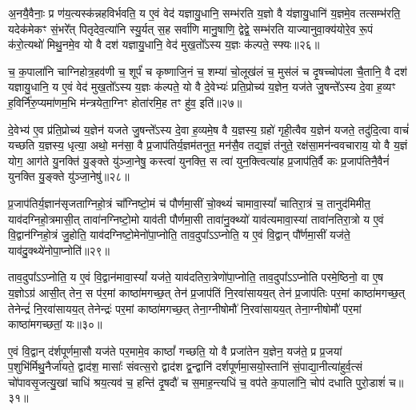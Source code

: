 अ॒नयै॒वैनाः॒ प्र ण॑य॒त्यस्क॑न्नहविर्भवति॒ य ए॒वं वेद॑ यज्ञायु॒धानि॒ सम्भ॑रति य॒ज्ञो वै य॑ज्ञायु॒धानि॑ य॒ज्ञमे॒व तत्सम्भ॑रति॒ यदेक॑मेकꣳ सं॒भरे᳚त् पितृदेव॒त्या॑नि स्यु॒र्यत् स॒ह सर्वा॑णि मानु॒षाणि॒ द्वेद्वे॒ सम्भ॑रति याज्यानुवा॒क्य॑योरे॒व रू॒पं क॑रो॒त्यथो॑ मिथु॒नमे॒व यो वै दश॑ यज्ञायु॒धानि॒ वेद॑ मुख॒तो᳚\-ऽस्य य॒ज्ञः क॑ल्पते॒ स्फ्यः॥२६॥

च॒ क॒पाला॑नि चाग्निहोत्र॒हव॑णी च॒ शूर्पं॑ च कृष्णाजि॒नं च॒ शम्या॑ चो॒लूख॑लं च॒ मुस॑लं च दृ॒षच्चोप॑ला चै॒तानि॒ वै दश॑ यज्ञायु॒धानि॒ य ए॒वं वेद॑ मुख॒तो᳚\-ऽस्य य॒ज्ञः क॑ल्पते॒ यो वै दे॒वेभ्यः॑ प्रति॒प्रोच्य॑ य॒ज्ञेन॒ यज॑ते जु॒षन्ते᳚\-ऽस्य दे॒वा ह॒व्यꣳ ह॒विर्नि॑रु॒प्यमा॑णम॒भि म॑न्त्रयेता॒ग्निꣳ होता॑रमि॒ह तꣳ हु॑व॒ इति॑॥२७॥

दे॒वेभ्य॑ ए॒व प्र॑ति॒प्रोच्य॑ य॒ज्ञेन॑ यजते जु॒षन्ते᳚\-ऽस्य दे॒वा ह॒व्यमे॒ष वै य॒ज्ञस्य॒ ग्रहो॑ गृही॒त्वैव य॒ज्ञेन॑ यजते॒ तदु॑दि॒त्वा वाचं॑ यच्छति य॒ज्ञस्य॒ धृत्या॒ अथो॒ मन॑सा॒ वै प्र॒जाप॑तिर्य॒ज्ञम॑तनुत॒ मन॑सै॒व तद्य॒ज्ञं त॑नुते॒ रक्ष॑सा॒मन॑न्ववचाराय॒ यो वै य॒ज्ञं योग॒ आग॑ते यु॒नक्ति॑ यु॒ङ्क्ते यु॑ञ्जा॒नेषु॒ कस्त्वा॑ युनक्ति॒ स त्वा॑ युन॒क्त्वित्या॑ह प्र॒जाप॑ति॒र्वै कः प्र॒जाप॑तिनै॒वैनं॑ युनक्ति यु॒ङ्क्ते यु॑ञ्जा॒नेषु॑॥२८॥

{\anuvakamend[{वै मनः॒ स्फ्य इति॑ युन॒क्त्वेका॑दश च॥८॥}]}

प्र॒जाप॑तिर्य॒ज्ञान॑सृजताग्निहो॒त्रं चा᳚ग्निष्टो॒मं च॑ पौर्णमा॒सीं चो॒क्थ्यं॑ चामावा॒स्यां᳚ चातिरा॒त्रं च॒ तानुद॑मिमीत॒ याव॑दग्निहो॒त्रमासी॒त् तावा॑नग्निष्टो॒मो याव॑ती पौर्णमा॒सी तावा॑नु॒क्थ्यो॑ याव॑त्यमावा॒स्या॑ तावा॑नतिरा॒त्रो य ए॒वं वि॒द्वान॑ग्निहो॒त्रं जु॒होति॒ याव॑दग्निष्टो॒मेनो॑पा॒प्नोति॒ ताव॒दुपा᳚\-ऽ\-ऽप्नोति॒ य ए॒वं वि॒द्वान् पौ᳚र्णमा॒सीं यज॑ते॒ याव॑दु॒क्थ्ये॑नोपा॒प्नोति॑॥२९॥

ताव॒दुपा᳚\-ऽ\-ऽप्नोति॒ य ए॒वं वि॒द्वान॑मावा॒स्यां᳚ यज॑ते॒ याव॑दतिरा॒त्रेणो॑पा॒प्नोति॒ ताव॒दुपा᳚\-ऽ\-ऽप्नोति परमे॒ष्ठिनो॒ वा ए॒ष य॒ज्ञो\-ऽग्र॑ आसी॒त् तेन॒ स प॑र॒मां काष्ठा॑मगच्छ॒त् तेन॑ प्र॒जाप॑तिं नि॒रवा॑सायय॒त् तेन॑ प्र॒जाप॑तिः पर॒मां काष्ठा॑मगच्छ॒त् तेनेन्द्रं॑ नि॒रवा॑सायय॒त् तेनेन्द्रः॑ पर॒मां काष्ठा॑मगच्छ॒त् तेना॒ग्नीषोमौ॑ नि॒रवा॑सायय॒त् तेना॒ग्नीषोमौ॑ पर॒मां काष्ठा॑मगच्छतां॒ यः॥३०॥

ए॒वं वि॒द्वान् द॑र्\mbox{}शपूर्णमा॒सौ यज॑ते पर॒मामे॒व काष्ठां᳚ गच्छति॒ यो वै प्रजा॑तेन य॒ज्ञेन॒ यज॑ते॒ प्र प्र॒जया॑ प॒शुभि॑र्मिथु॒नैर्जा॑यते॒ द्वाद॑श॒ मासाः᳚ संवत्स॒रो द्वाद॑श द्व॒न्द्वानि॑ दर्\mbox{}शपूर्णमा॒सयो॒स्तानि॑ सं॒पाद्या॒नीत्या॑हुर्व॒त्सं चो॑पावसृ॒जत्यु॒खां चाधि॑ श्रय॒त्यव॑ च॒ हन्ति॑ दृ॒षदौ॑ च स॒माह॒न्त्यधि॑ च॒ वप॑ते क॒पाला॑नि॒ चोप॑ दधाति पुरो॒डाशं॑ च॥३१॥

